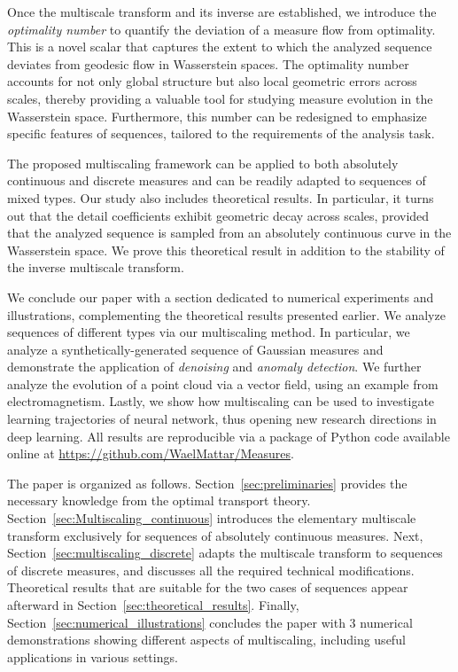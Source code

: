 \documentclass[12pt]{amsart}
\begin{document}
Once the multiscale transform and its inverse are established, we introduce the \emph{optimality number} to quantify the deviation of a measure flow from optimality. This is a novel scalar that captures the extent to which the analyzed sequence deviates from geodesic flow in Wasserstein spaces. The optimality number accounts for not only global structure but also local geometric errors across scales, thereby providing a valuable tool for studying measure evolution in the Wasserstein space. Furthermore, this number can be redesigned to emphasize specific features of sequences, tailored to the requirements of the analysis task.

The proposed multiscaling framework can be applied to both absolutely continuous and discrete measures and can be readily adapted to sequences of mixed types. Our study also includes theoretical results. In particular, it turns out that the detail coefficients exhibit geometric decay across scales, provided that the analyzed sequence is sampled from an absolutely continuous curve in the Wasserstein space. We prove this theoretical result in addition to the stability of the inverse multiscale transform.

We conclude our paper with a section dedicated to numerical experiments and illustrations, complementing the theoretical results presented earlier. We analyze sequences of different types via our multiscaling method. In particular, we analyze a synthetically-generated sequence of Gaussian measures and demonstrate the application of \emph{denoising} and \emph{anomaly detection}. We further analyze the evolution of a point cloud via a vector field, using an example from electromagnetism. Lastly, we show how multiscaling can be used to investigate learning trajectories of neural network, thus opening new research directions in deep learning. All results are reproducible via a package of Python code available online at \href{https://github.com/WaelMattar/Measures}{https://github.com/WaelMattar/Measures}.

The paper is organized as follows. Section~\ref{sec:preliminaries} provides the necessary knowledge from the optimal transport theory. Section~\ref{sec:Multiscaling_continuous} introduces the elementary multiscale transform exclusively for sequences of absolutely continuous measures. Next, Section~\ref{sec:multiscaling_discrete} adapts the multiscale transform to sequences of discrete measures, and discusses all the required technical modifications. Theoretical results that are suitable for the two cases of sequences appear afterward in Section~\ref{sec:theoretical_results}. Finally, Section~\ref{sec:numerical_illustrations} concludes the paper with 3 numerical demonstrations showing different aspects of multiscaling, including useful applications in various settings.
\end{document}

